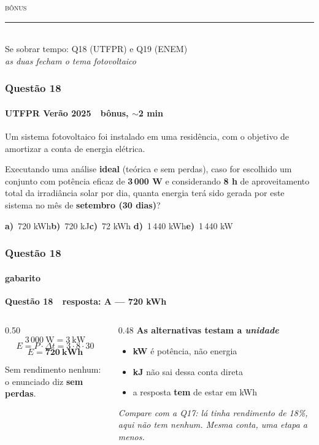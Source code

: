 \documentclass[aspectratio=169,12pt]{beamer}
\newcommand{\alternativascurtas}[5]{%
  \par\vspace{0.7em}%
  \noindent\textbf{a)}~#1\hfill\textbf{b)}~#2\hfill\textbf{c)}~#3%
  \hfill\textbf{d)}~#4\hfill\textbf{e)}~#5\par}
\newcommand{\resposta}[2]{%
  \par\vspace{0.2em}
  {\Large\bfseries\color{vinho}Quest\~ao #1 \,\textemdash\, resposta: #2}
  \par\vspace{0.6em}}
\begin{document}
\begin{frame}[plain]
\vspace{1.6cm}
\centering
{\scshape\color{vinho}\Large b\^onus}\\[0.4em]
{\color{vinho}\rule{0.55\textwidth}{1.2pt}}\\[0.9em]
{\large Se sobrar tempo: Q18 (UTFPR) e Q19 (ENEM)}\\[0.4em]
{\color{grafite}\itshape as duas fecham o tema fotovoltaico}
\end{frame}

\begin{frame}
\frametitle{Quest\~ao 18}
\framesubtitle{UTFPR Ver\~ao 2025 \,\textperiodcentered\, b\^onus, $\sim$2 min}

Um sistema fotovoltaico foi instalado em uma resid\^encia, com o
objetivo de amortizar a conta de energia el\'etrica.

\vspace{0.4em}
Executando uma an\'alise \textbf{ideal} (te\'orica e sem perdas), caso
for escolhido um conjunto com pot\^encia eficaz de \textbf{3\,000 W} e
considerando \textbf{8 h} de aproveitamento total da irradi\^ancia
solar por dia, quanta energia ter\'a sido gerada por este sistema no
m\^es de \textbf{setembro (30 dias)}?

\alternativascurtas{720 kWh}{720 kJ}{72 kWh}{1\,440 kWh}{1\,440 kW}
\end{frame}

\begin{frame}
\frametitle{Quest\~ao 18}
\framesubtitle{gabarito}
\resposta{18}{A --- 720 kWh}

\begin{columns}[T]
\begin{column}{0.50\textwidth}
\[ 3\,000\ \text{W} = 3\ \text{kW} \]
\[ E = P\cdot\Delta t = 3 \cdot 8 \cdot 30 \]
\[ E = \mathbf{720\ kWh} \]

\vspace{0.3em}
Sem rendimento nenhum: o enunciado diz \textbf{sem perdas}.
\end{column}
\begin{column}{0.48\textwidth}
\textbf{As alternativas testam a \textit{unidade}}
\begin{itemize}
  \item \textbf{kW} \'e pot\^encia, n\~ao energia
  \item \textbf{kJ} n\~ao sai dessa conta direta
  \item a resposta \textbf{tem} de estar em kWh
\end{itemize}

\vspace{0.4em}
{\color{grafite}\itshape Compare com a Q17: l\'a tinha rendimento de
18\%, aqui n\~ao tem nenhum. Mesma conta, uma etapa a menos.}
\end{column}
\end{columns}
\end{frame}
\end{document}

